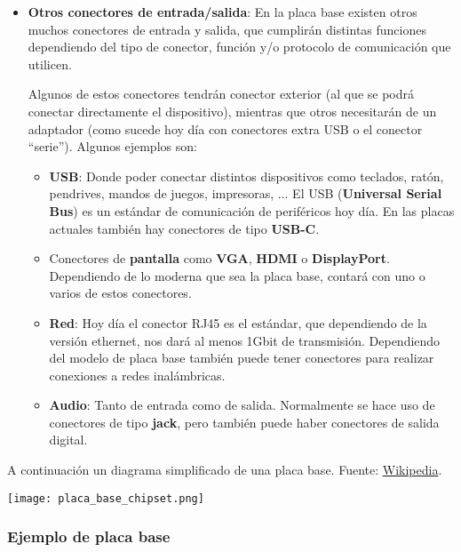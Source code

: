 \begin{itemize}
    \item \textbf{Otros conectores de entrada/salida}: En la placa base existen otros muchos conectores de entrada y salida, que cumplirán distintas funciones dependiendo del tipo de conector, función y/o protocolo de comunicación que utilicen.

    Algunos de estos conectores tendrán conector exterior (al que se podrá conectar directamente el dispositivo), mientras que otros necesitarán de un adaptador (como sucede hoy día con conectores extra USB o el conector “serie”). Algunos ejemplos son:
    \begin{itemize}
        \item \textbf{USB}: Donde poder conectar distintos dispositivos como teclados, ratón, pendrives, mandos de juegos, impresoras, ... El USB (\textbf{Universal Serial Bus}) es un estándar de comunicación de periféricos hoy día. En las placas actuales también hay conectores de tipo \textbf{USB-C}.

        \item Conectores de \textbf{pantalla} como \textbf{VGA}, \textbf{HDMI} o \textbf{DisplayPort}. Dependiendo de lo moderna que sea la placa base, contará con uno o varios de estos conectores.

        \item \textbf{Red}: Hoy día el conector RJ45 es el estándar, que dependiendo de la versión ethernet, nos dará al menos 1Gbit de transmisión. Dependiendo del modelo de placa base también puede tener conectores para realizar conexiones a redes inalámbricas.

        \item \textbf{Audio}: Tanto de entrada como de salida. Normalmente se hace uso de conectores de tipo \textbf{jack}, pero también puede haber conectores de salida digital.
    \end{itemize}

\end{itemize}

A continuación un diagrama simplificado de una placa base. Fuente: \href{https://es.wikipedia.org/wiki/Placa_base}{Wikipedia}.
\vspace{-10pt}
\begin{center}
    \texttt{[image: placa\_base\_chipset.png]}
\end{center}


\subsubsection{Ejemplo de placa base}

